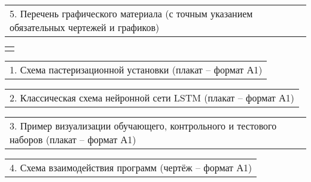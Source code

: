 \documentclass[12pt, А4, twoside]{article}
\begin{document}
\begin{FlushLeft}
    \vspace{0.1 cm}

    \begin{tabular}{p{17.25cm}}
        \textsf{5. Перечень графического материала (с точным указанием обязательных чертежей и графиков)} \vspace{0pt} \hline \\
    \end{tabular}

    \begin{tabular}{p{17.25cm}}
        \vspace{0pt} \hline \\
    \end{tabular}

    \vspace{-0.1 cm}

    \begin{tabular}{p{17.25cm}}
        \hspace{0.3cm} \textsf{1. Схема пастеризационной установки (плакат {--} формат А1)} \vspace{0pt} \hline  \\
    \end{tabular}

    \vspace{-0.1 cm}

    \begin{tabular}{p{17.25cm}}
        \hspace{0.3cm} \textsf{2. Классическая схема нейронной сети LSTM (плакат {--} формат А1)} \vspace{0pt} \hline  \\
    \end{tabular}

    \vspace{-0.1 cm}

    \begin{tabular}{p{17.25cm}}
        \hspace{0.3cm} \textsf{3. Пример визуализации обучающего, контрольного и тестового наборов (плакат {--} формат А1)} \vspace{0pt} \hline  \\
    \end{tabular}

    \vspace{-0.1 cm}

    \begin{tabular}{p{17.25cm}}
        \hspace{0.3cm} \textsf{4. Схема взаимодействия программ (чертёж {--} формат А1)} \vspace{0pt} \hline  \\
    \end{tabular}


\end{FlushLeft}
\end{document}
